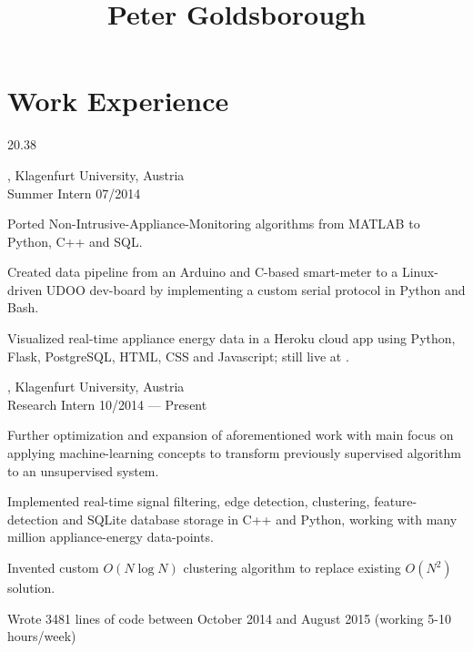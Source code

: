 




\begin{header}
	\title{Peter Goldsborough}
	\separate
	\separate
\end{header}

\section{Work Experience}{2}{0.38}

\begin{entry}
	{, Klagenfurt University, Austria}
	{\\Summer Intern}
	{07/2014}

	\item Ported Non-Intrusive-Appliance-Monitoring algorithms from MATLAB to Python, C++ and SQL.
	\item Created data pipeline from an Arduino and C-based smart-meter to a Linux-driven UDOO dev-board by implementing a custom serial protocol in Python and Bash.
	\item Visualized real-time appliance energy data in a Heroku cloud app using Python, Flask, PostgreSQL, HTML, CSS and Javascript; still live at .
\end{entry}

\begin{entry}
	{, Klagenfurt University, Austria}
	{\\Research Intern}
	{10/2014 --- Present}
	\item Further optimization and expansion of aforementioned work with main focus on applying machine-learning concepts to transform previously supervised algorithm to an unsupervised system.
	\item Implemented real-time signal filtering, edge detection, clustering, feature-detection and SQLite database storage in C++ and Python, working with many million appliance-energy data-points.
	\item Invented custom $O(N \log N)$ clustering algorithm to replace existing $O(N^2)$ solution.
	\item Wrote 3481 lines of code between October 2014 and August 2015 (working 5-10 hours/week)
\end{entry}

